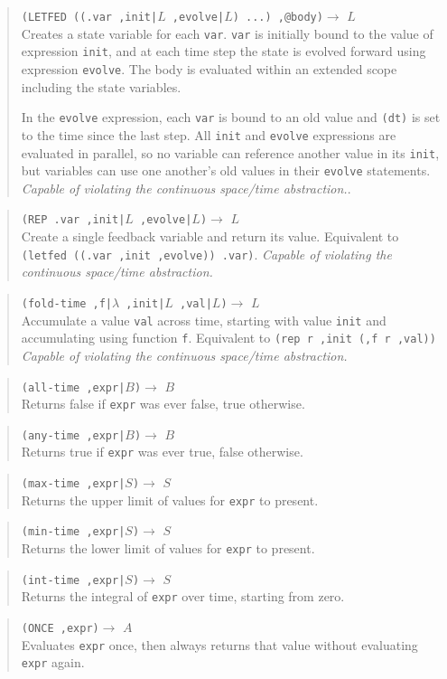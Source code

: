\documentclass{article}
\newcommand\violation{{\em Capable of violating the continuous
    space/time abstraction.}}
\newcommand\function[3]
{\begin{quote}{\tt #1}$\rightarrow$ \type{#2} \\ #3 \end{quote}}
\newcommand\type[1]{$#1$}
\newcommand\var[1]{{\tt #1}}
\begin{document}
\function{(LETFED ((.var ,init|\type{L} ,evolve|\type{L}) ...)
  ,@body)}{L} {Creates a state variable for each \var{var}.  \var{var}
  is initially bound to the value of expression \var{init}, and at
  each time step the state is evolved forward using expression
  \var{evolve}.  The body is evaluated within an extended scope
  including the state variables.
  
  In the \var{evolve} expression, each \var{var} is bound to an old
  value and \var{(dt)} is set to the time since the last step.
  All \var{init} and \var{evolve} expressions are evaluated in
  parallel, so no variable can reference another value in its
  \var{init}, but variables can use one another's old values in their
  \var{evolve} statements.  \violation{}.}

\function{(REP .var ,init|\type{L} ,evolve|\type{L})}{L}{Create
  a single feedback variable and return its value.  Equivalent to
  \var{(letfed ((.var ,init ,evolve)) .var)}.  \violation{}}

\function{(fold-time ,f|\type{\lambda} ,init|\type{L}
  ,val|\type{L})}{L}{Accumulate a value \var{val} across time,
  starting with value \var{init} and accumulating using function
  \var{f}.  Equivalent to \var{(rep r ,init (,f r ,val))}
  \violation{}}

\function{(all-time ,expr|\type{B})}{B}{Returns false if \var{expr}
  was ever false, true otherwise.}

\function{(any-time ,expr|\type{B})}{B}{Returns true if \var{expr} was
  ever true, false otherwise.}

\function{(max-time ,expr|\type{S})}{S}{Returns the upper limit of
  values for \var{expr} to present.}

\function{(min-time ,expr|\type{S})}{S}{Returns the lower limit of
  values for \var{expr} to present.}

\function{(int-time ,expr|\type{S})}{S}{Returns the integral of \var{expr}
  over time, starting from zero.}

\function{(ONCE ,expr)}{A}{Evaluates \var{expr} once, then always returns
  that value without evaluating \var{expr} again.}
\end{document}
